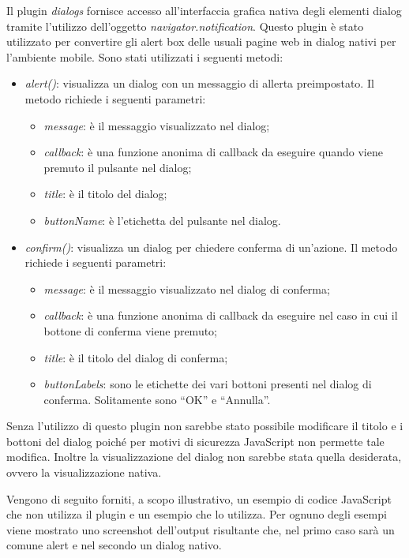 Il plugin \textit{dialogs} fornisce accesso all'interfaccia grafica nativa degli elementi dialog tramite l'utilizzo dell'oggetto \textit{navigator.notification}. Questo plugin è stato utilizzato per convertire gli alert box delle usuali pagine web in dialog nativi per l'ambiente mobile. Sono stati utilizzati i seguenti metodi:
\begin{itemize}
	\item \textit{alert()}: visualizza un dialog con un messaggio di allerta preimpostato. Il metodo richiede i seguenti parametri:
	\begin{itemize}
		\item \textit{message}: è il messaggio visualizzato nel dialog;
		\item \textit{callback}: è una funzione anonima di callback da eseguire quando viene premuto il pulsante nel dialog;
		\item \textit{title}: è il titolo del dialog;
		\item \textit{buttonName}: è l'etichetta del pulsante nel dialog.
	\end{itemize}
	\item \textit{confirm()}: visualizza un dialog per chiedere conferma di un'azione. Il metodo richiede i seguenti parametri:
	\begin{itemize}
		\item \textit{message}: è il messaggio visualizzato nel dialog di conferma;
		\item \textit{callback}: è una funzione anonima di callback da eseguire nel caso in cui il bottone di conferma viene premuto;
		\item \textit{title}: è il titolo del dialog di conferma;
		\item \textit{buttonLabels}: sono le etichette dei vari bottoni presenti nel dialog di conferma. Solitamente sono ``OK'' e ``Annulla''.
	\end{itemize}
\end{itemize}

Senza l'utilizzo di questo plugin non sarebbe stato possibile modificare il titolo e i bottoni del dialog poiché per motivi di sicurezza JavaScript non permette tale modifica. Inoltre la visualizzazione del dialog non sarebbe stata quella desiderata, ovvero la visualizzazione nativa. 

Vengono di seguito forniti, a scopo illustrativo, un esempio di codice JavaScript che non utilizza il plugin e un esempio che lo utilizza. Per ognuno degli esempi viene mostrato uno screenshot dell'output risultante che, nel primo caso sarà un comune alert e nel secondo un dialog nativo.

